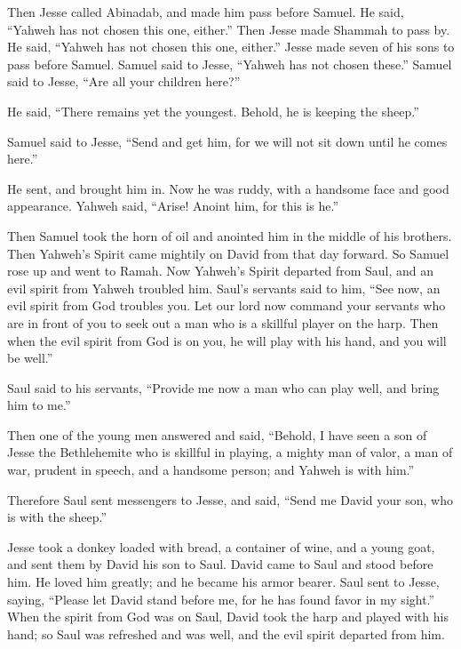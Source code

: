  Then Jesse called Abinadab, and made him pass before
Samuel. He said, ``Yahweh has not chosen this one, either.''
 Then Jesse made Shammah to pass by. He said, ``Yahweh has
not chosen this one, either.''  Jesse made seven of his
sons to pass before Samuel. Samuel said to Jesse, ``Yahweh has not
chosen these.''  Samuel said to Jesse, ``Are all your
children here?''

He said, ``There remains yet the youngest. Behold, he is keeping the
sheep.''

Samuel said to Jesse, ``Send and get him, for we will not sit down until
he comes here.''

 He sent, and brought him in. Now he was ruddy, with a
handsome face and good appearance. Yahweh said, ``Arise! Anoint him, for
this is he.''

 Then Samuel took the horn of oil and anointed him in the
middle of his brothers. Then Yahweh's Spirit came mightily on David from
that day forward. So Samuel rose up and went to Ramah. 
Now Yahweh's Spirit departed from Saul, and an evil spirit from Yahweh
troubled him.  Saul's servants said to him, ``See now, an
evil spirit from God troubles you.  Let our lord now
command your servants who are in front of you to seek out a man who is a
skillful player on the harp. Then when the evil spirit from God is on
you, he will play with his hand, and you will be well.''

 Saul said to his servants, ``Provide me now a man who
can play well, and bring him to me.''

 Then one of the young men answered and said, ``Behold, I
have seen a son of Jesse the Bethlehemite who is skillful in playing, a
mighty man of valor, a man of war, prudent in speech, and a handsome
person; and Yahweh is with him.''

 Therefore Saul sent messengers to Jesse, and said,
``Send me David your son, who is with the sheep.''

 Jesse took a donkey loaded with bread, a container of
wine, and a young goat, and sent them by David his son to Saul.
 David came to Saul and stood before him. He loved him
greatly; and he became his armor bearer.  Saul sent to
Jesse, saying, ``Please let David stand before me, for he has found
favor in my sight.''  When the spirit from God was on
Saul, David took the harp and played with his hand; so Saul was
refreshed and was well, and the evil spirit departed from him.

